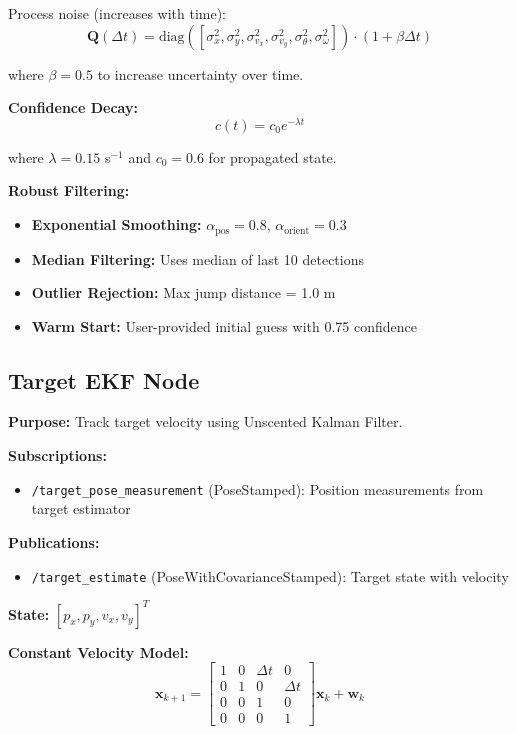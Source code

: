 \documentclass[11pt]{article}
\begin{document}
Process noise (increases with time):
\[
\mathbf{Q}(\Delta t) = \text{diag}([\sigma_x^2, \sigma_y^2, \sigma_{v_x}^2, \sigma_{v_y}^2, \sigma_{\theta}^2, \sigma_{\omega}^2]) \cdot (1 + \beta \Delta t)
\]

where $\beta = 0.5$ to increase uncertainty over time.

\textbf{Confidence Decay:}
\[
c(t) = c_0 e^{-\lambda t}
\]

where $\lambda = 0.15$ s$^{-1}$ and $c_0 = 0.6$ for propagated state.

\textbf{Robust Filtering:}

\begin{itemize}
    \item \textbf{Exponential Smoothing:} $\alpha_{\text{pos}} = 0.8$, $\alpha_{\text{orient}} = 0.3$
    \item \textbf{Median Filtering:} Uses median of last 10 detections
    \item \textbf{Outlier Rejection:} Max jump distance = 1.0 m
    \item \textbf{Warm Start:} User-provided initial guess with 0.75 confidence
\end{itemize}

\subsection{Target EKF Node}

\textbf{Purpose:} Track target velocity using Unscented Kalman Filter.

\textbf{Subscriptions:}
\begin{itemize}
    \item \texttt{/target\_pose\_measurement} (PoseStamped): Position measurements from target estimator
\end{itemize}

\textbf{Publications:}
\begin{itemize}
    \item \texttt{/target\_estimate} (PoseWithCovarianceStamped): Target state with velocity
\end{itemize}

\textbf{State:} $[p_x, p_y, v_x, v_y]^T$

\textbf{Constant Velocity Model:}
\[
\mathbf{x}_{k+1} = \begin{bmatrix}
1 & 0 & \Delta t & 0 \\
0 & 1 & 0 & \Delta t \\
0 & 0 & 1 & 0 \\
0 & 0 & 0 & 1
\end{bmatrix} \mathbf{x}_k + \mathbf{w}_k
\]
\end{document}
